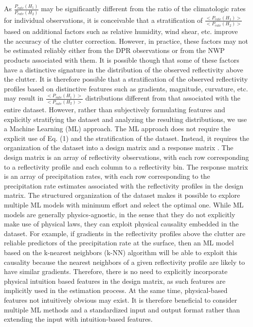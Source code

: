 \documentclass{article}
\begin{document}
As $\frac {P_{rate}(H_1)} {P_{rate}(H_2)}$ may be significantly different from
the ratio of the climatologic rates for individual observations, it is
conceivable that a stratification of $\frac {<P_{rate}(H_1)>} {<P_{rate}(H_2)>}$
based on additional factors such as relative humidity, wind shear, etc.
improve the accuracy of the clutter correction. However, in practice,
these factors may not be estimated reliably either from the DPR
observations or from the NWP products associated with them. It is 
possible though that some of these factors have a distinctive signature
in the distribution of the observed reflectivity above the clutter. It
is therefore possible that a stratification of the observed reflectivity
profiles based on distinctive features such as gradients, magnitude, 
curvature, etc. may result in $\frac {<P_{rate}(H_1)>} {<P_{rate}(H_2)>}$
distributions different from that associated with the entire dataset. 
However, rather than subjectively formulating features and explicitly
stratifying the dataset and analyzing the resulting distributions, we
use a Machine Learning (ML) approach.  The ML approach does not require
the explicit use of Eq. (1) and the stratification of the dataset. Instead,
it requires the organization of the dataset into a design matrix and a
response matrix \cite{bishop2006}. The design matrix is an array of 
reflectivity observations, with each row corresponding to a reflectivity
profile and each column to a reflectivity bin. The response matrix is an
array of precipitation rates, with each row corresponding to the
precipitation rate estimates associated with the reflectivity profiles
in the design matrix. The structured organization of the dataset makes it 
possible to explore multiple ML models with minimum effort and select the
optimal one. While ML models are generally physics-agnostic, in the sense
that they do not explicitly make use of physical laws, they can exploit
physical causality embedded in the dataset. For example, if gradients in
the reflectivity profiles above the clutter are reliable
predictors of the precipitation rate at the surface, then an 
ML model based on the k-nearest neighbors (k-NN) algorithm \cite{bishop2006}
will be able to exploit this causality because the nearest neighbors of
a given reflectivity profile are likely to have similar gradients. 
Therefore, there is no need to explicitly incorporate physical intuition
based features in the design matrix, as such features are implicitly
used in the estimation process.  At the same time, physical-based 
features not intuitively obvious may exist. It is therefore beneficial to
consider multiple ML methods and a standardized input and output format 
rather than extending the input with intuition-based features.%
\end{document}
